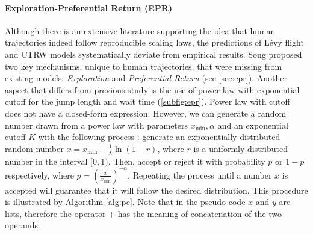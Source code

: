 \paragraph{Exploration-Preferential Return (EPR)}

Although there is an extensive literature supporting the idea that human trajectories indeed follow reproducible scaling laws, the predictions of L\'evy flight and CTRW models systematically deviate from empirical results. Song \et \cite{song_2010_modelling} proposed two key mechanisms, unique to human trajectories, that were missing from existing models: \emph{Exploration} and \emph{Preferential Return} (see \sectionname\ref{sec:epr}). Another aspect that differs from previous study is the use of power law with exponential cutoff for the jump length and wait time (\figurename\ref{subfig:epr}).  Power law with cutoff does not have a closed-form expression. However, we can generate a random number drawn from a power law with parameters $x_{\text{min}}, \alpha$ and an exponential cutoff $K$ with the following process \cite{clauset_2009_power}: generate an exponentially distributed random number $x = x_{\text{min}} - \frac{1}{\lambda} \ln \left(1-r\right)$, where $r$ is a uniformly distributed number in the interval $[0,1)$. Then, accept or reject it with probability $p$ or $1 - p$ respectively, where $p = \left(\frac{x}{x_{\text{min}}}\right)^{-\alpha}$. Repeating the process until a number $x$ is accepted will guarantee that it will follow the desired distribution. This procedure is illustrated by Algorithm \ref{alg:pc}. Note that in the pseudo-code $x$ and $y$ are lists, therefore the operator $+$ has the meaning of concatenation of the two operands.
%
